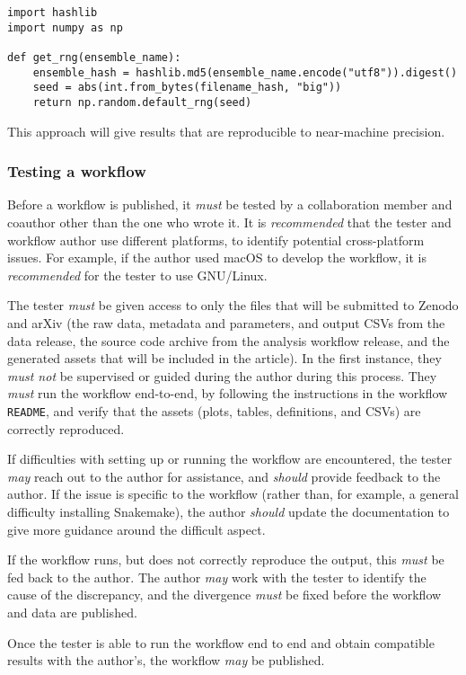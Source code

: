 \documentclass{article}
\newcommand\rfcword[1]{\emph{#1}\xspace}
\newcommand\must{\rfcword{must}}
\newcommand\mustnot{\rfcword{must not}}
\newcommand\should{\rfcword{should}}
\newcommand\recommended{\rfcword{recommended}}
\newcommand\may{\rfcword{may}}
\newcommand\filename[1]{\texttt{#1}\xspace}
\newcommand\readme{\filename{README}\xspace}
\begin{document}
\begin{verbatim}
import hashlib
import numpy as np

def get_rng(ensemble_name):
    ensemble_hash = hashlib.md5(ensemble_name.encode("utf8")).digest()
    seed = abs(int.from_bytes(filename_hash, "big"))
    return np.random.default_rng(seed)
\end{verbatim}

This approach will give results that are reproducible to near-machine precision.

\subsubsection{Testing a workflow}\label{sec:testing}

Before a workflow is published,
it \must be tested by a collaboration member and coauthor other than the one who wrote it.
It is \recommended that the tester and workflow author use different platforms,
to identify potential cross-platform issues.
For example,
if the author used macOS to develop the workflow,
it is \recommended for the tester to use GNU/Linux.

The tester \must be given access to only the files that will be submitted to Zenodo and arXiv
(the raw data, metadata and parameters, and output CSVs from the data release,
the source code archive from the analysis workflow release,
and the generated assets that will be included in the article).
In the first instance,
they \mustnot be supervised or guided during the author during this process.
They \must run the workflow end-to-end,
by following the instructions in the workflow \readme,
and verify that the assets
(plots, tables, definitions, and CSVs)
are correctly reproduced.

If difficulties with setting up or running the workflow are encountered,
the tester \may reach out to the author for assistance,
and \should provide feedback to the author.
If the issue is specific to the workflow
(rather than,
for example,
a general difficulty installing Snakemake),
the author \should update the documentation to give more guidance around the difficult aspect.

If the workflow runs,
but does not correctly reproduce the output,
this \must be fed back to the author.
The author \may work with the tester to identify the cause of the discrepancy,
and the divergence \must be fixed before the workflow and data are published.

Once the tester is able to run the workflow end to end
and obtain compatible results with the author's,
the workflow \may be published.
\end{document}
